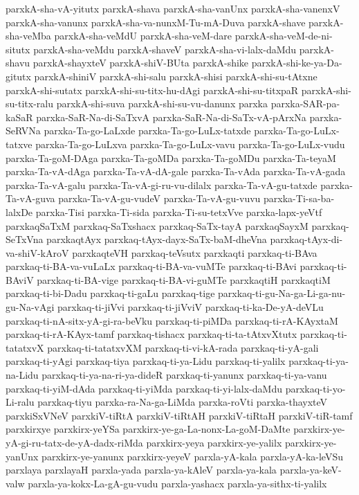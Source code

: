 {parxkA-sha-vA-yitutx
parxkA-shava
parxkA-sha-vanUnx
parxkA-sha-vanenxV
parxkA-sha-vanunx
parxkA-sha-va-nunxM-Tu-mA-Duva
parxkA-shave
parxkA-sha-veMba
parxkA-sha-veMdU
parxkA-sha-veM-dare
parxkA-sha-veM-de-ni-situtx
parxkA-sha-veMdu
parxkA-shaveV
parxkA-sha-vi-lalx-daMdu
parxkA-shavu
parxkA-shayxteV
parxkA-shiV-BUta
parxkA-shike
parxkA-shi-ke-ya-Da-gitutx
parxkA-shiniV
parxkA-shi-salu
parxkA-shisi
parxkA-shi-su-tAtxne
parxkA-shi-sutatx
parxkA-shi-su-titx-hu-dAgi
parxkA-shi-su-titxpaR
parxkA-shi-su-titx-ralu
parxkA-shi-suva
parxkA-shi-su-vu-danunx
parxka
parxka-SAR-pa-kaSaR
parxka-SaR-Na-di-SaTxvA
parxka-SaR-Na-di-SaTx-vA-pArxNa
parxka-SeRVNa
parxka-Ta-go-LaLxde
parxka-Ta-go-LuLx-tatxde
parxka-Ta-go-LuLx-tatxve
parxka-Ta-go-LuLxva
parxka-Ta-go-LuLx-vavu
parxka-Ta-go-LuLx-vudu
parxka-Ta-goM-DAga
parxka-Ta-goMDa
parxka-Ta-goMDu
parxka-Ta-teyaM
parxka-Ta-vA-dAga
parxka-Ta-vA-dA-gale
parxka-Ta-vAda
parxka-Ta-vA-gada
parxka-Ta-vA-galu
parxka-Ta-vA-gi-ru-vu-dilalx
parxka-Ta-vA-gu-tatxde
parxka-Ta-vA-guva
parxka-Ta-vA-gu-vudeV
parxka-Ta-vA-gu-vuvu
parxka-Ti-sa-ba-lalxDe
parxka-Tisi
parxka-Ti-sida
parxka-Ti-su-tetxVve
parxka-lapx-yeVtf
parxkaqSaTxM
parxkaq-SaTxshacx
parxkaq-SaTx-tayA
parxkaqSayxM
parxkaq-SeTxVna
parxkaqtAyx
parxkaq-tAyx-dayx-SaTx-baM-dheVna
parxkaq-tAyx-di-va-shiV-kAroV
parxkaqteVH
parxkaq-teVsutx
parxkaqti
parxkaq-ti-BAva
parxkaq-ti-BA-va-vuLaLx
parxkaq-ti-BA-va-vuMTe
parxkaq-ti-BAvi
parxkaq-ti-BAviV
parxkaq-ti-BA-vige
parxkaq-ti-BA-vi-guMTe
parxkaqtiH
parxkaqtiM
parxkaq-ti-bi-Dadu
parxkaq-ti-gaLu
parxkaq-tige
parxkaq-ti-gu-Na-ga-Li-ga-nu-gu-Na-vAgi
parxkaq-ti-jiVvi
parxkaq-ti-jiVviV
parxkaq-ti-ka-De-yA-deVLu
parxkaq-ti-nA-sitx-yA-gi-ra-beVku
parxkaq-ti-piMDa
parxkaq-ti-rA-KAyxtaM
parxkaq-ti-rA-KAyx-tamf
parxkaq-tishacx
parxkaq-ti-ta-tAtxvXtutx
parxkaq-ti-tatatxvX
parxkaq-ti-tatatxvXM
parxkaq-ti-vi-kA-rada
parxkaq-ti-yA-gali
parxkaq-ti-yAgi
parxkaq-tiya
parxkaq-ti-ya-Lidu
parxkaq-ti-yalilx
parxkaq-ti-ya-na-Lidu
parxkaq-ti-ya-na-ri-ya-dideR
parxkaq-ti-yanunx
parxkaq-ti-ya-vanu
parxkaq-ti-yiM-dAda
parxkaq-ti-yiMda
parxkaq-ti-yi-lalx-daMdu
parxkaq-ti-yo-Li-ralu
parxkaq-tiyu
parxka-ra-Na-ga-LiMda
parxka-roVti
parxka-thayxteV
parxkiSxVNeV
parxkiV-tiRtA
parxkiV-tiRtAH
parxkiV-tiRtaH
parxkiV-tiR-tamf
parxkirxye
parxkirx-yeYSa
parxkirx-ye-ga-La-nonx-La-goM-DaMte
parxkirx-ye-yA-gi-ru-tatx-de-yA-dadx-riMda
parxkirx-yeya
parxkirx-ye-yalilx
parxkirx-ye-yanUnx
parxkirx-ye-yanunx
parxkirx-yeyeV
parxla-yA-kala
parxla-yA-ka-leVSu
parxlaya
parxlayaH
parxla-yada
parxla-ya-kAleV
parxla-ya-kala
parxla-ya-keV-valw
parxla-ya-kokx-La-gA-gu-vudu
parxla-yashacx
parxla-ya-sithx-ti-yalilx
}
